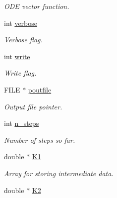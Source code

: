 \begin{DoxyCompactItemize}
\begin{DoxyCompactList}\small\item\em O\-D\-E vector function. \end{DoxyCompactList}\item 
\hypertarget{structrk4_af11a7c143fbea8168fb9d5d5c259e05e}{int \hyperlink{structrk4_af11a7c143fbea8168fb9d5d5c259e05e}{verbose}}\label{structrk4_af11a7c143fbea8168fb9d5d5c259e05e}

\begin{DoxyCompactList}\small\item\em Verbose flag. \end{DoxyCompactList}\item 
\hypertarget{structrk4_a23e792b89a89229f6d7a23190c98d9d8}{int \hyperlink{structrk4_a23e792b89a89229f6d7a23190c98d9d8}{write}}\label{structrk4_a23e792b89a89229f6d7a23190c98d9d8}

\begin{DoxyCompactList}\small\item\em Write flag. \end{DoxyCompactList}\item 
\hypertarget{structrk4_ad2b4a48f52e1ea5206a306827ba717b7}{F\-I\-L\-E $\ast$ \hyperlink{structrk4_ad2b4a48f52e1ea5206a306827ba717b7}{poutfile}}\label{structrk4_ad2b4a48f52e1ea5206a306827ba717b7}

\begin{DoxyCompactList}\small\item\em Output file pointer. \end{DoxyCompactList}\item 
\hypertarget{structrk4_afdb98234387428a832f96e7ccc2ec470}{int \hyperlink{structrk4_afdb98234387428a832f96e7ccc2ec470}{n\-\_\-steps}}\label{structrk4_afdb98234387428a832f96e7ccc2ec470}

\begin{DoxyCompactList}\small\item\em Number of steps so far. \end{DoxyCompactList}\item 
\hypertarget{structrk4_ae34ed14cd80bff2057d6c608e8ee9073}{double $\ast$ \hyperlink{structrk4_ae34ed14cd80bff2057d6c608e8ee9073}{K1}}\label{structrk4_ae34ed14cd80bff2057d6c608e8ee9073}

\begin{DoxyCompactList}\small\item\em Array for storing intermediate data. \end{DoxyCompactList}\item 
\hypertarget{structrk4_a0a27f914e752daa876b07c31afa6babf}{double $\ast$ \hyperlink{structrk4_a0a27f914e752daa876b07c31afa6babf}{K2}}\label{structrk4_a0a27f914e752daa876b07c31afa6babf}


\end{DoxyCompactItemize}
